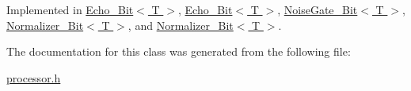 Implemented in \hyperlink{classEcho__16Bit_ac3ba5af13a6bc7c62c6efa932ebd6f48}{Echo\+\_\+Bit$<$ T $>$}, \hyperlink{classEcho__8Bit_a01c7182a58f21a4a0bc0cd040720b109}{Echo\+\_\+Bit$<$ T $>$}, \hyperlink{classNoiseGate__8Bit_a76df76db3661572eb4f96bf7094df31b}{Noise\+Gate\+\_\+Bit$<$ T $>$}, \hyperlink{classNormalizer__16Bit_aa1f13f72888abe2929716c4fe56cdf41}{Normalizer\+\_\+Bit$<$ T $>$}, and \hyperlink{classNormalizer__8Bit_aaadd6fc8065b38bd09021d9a6bf93c03}{Normalizer\+\_\+Bit$<$ T $>$}.



The documentation for this class was generated from the following file\+:\begin{DoxyCompactItemize}
\item 
\hyperlink{processor_8h}{processor.\+h}\end{DoxyCompactItemize}
